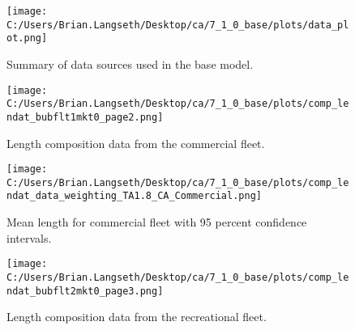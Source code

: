 \documentclass[11pt,
  english,
  letterpaper,
]{article}
\begin{document}
\tagmcend\tagstructend


\begin{figure}
\centering
\texttt{[image: C:/Users/Brian.Langseth/Desktop/ca/7\_1\_0\_base/plots/data\_plot.png]}
\caption{Summary of data sources used in the base model.\label{fig:data-plot}}
\end{figure}

\tagmcend\tagstructend


\begin{figure}
\centering
\texttt{[image: C:/Users/Brian.Langseth/Desktop/ca/7\_1\_0\_base/plots/comp\_lendat\_bubflt1mkt0\_page2.png]}
\caption{Length composition data from the commercial fleet.\label{fig:com-len-data}}
\end{figure}

\tagmcend\tagstructend


\begin{figure}
\centering
\texttt{[image: C:/Users/Brian.Langseth/Desktop/ca/7\_1\_0\_base/plots/comp\_lendat\_data\_weighting\_TA1.8\_CA\_Commercial.png]}
\caption{Mean length for commercial fleet with 95 percent confidence intervals.\label{fig:mean-com-len-data}}
\end{figure}

\tagmcend\tagstructend


\begin{figure}
\centering
\texttt{[image: C:/Users/Brian.Langseth/Desktop/ca/7\_1\_0\_base/plots/comp\_lendat\_bubflt2mkt0\_page3.png]}
\caption{Length composition data from the recreational fleet.\label{fig:rec-len-data}}
\end{figure}

\tagmcend\tagstructend
\end{document}
